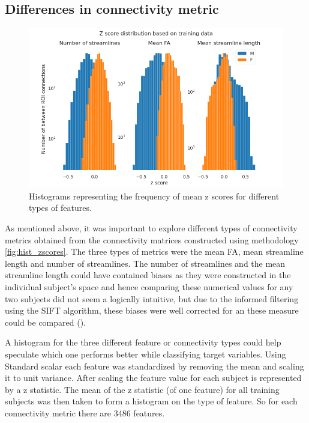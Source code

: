 \documentclass[msthesis.tex]{subfiles}
\begin{document}
\subsection{Differences in connectivity metric}
\begin{figure}
    \centering
    \includegraphics[width=\textwidth]{images/zscoredist.png}
    \caption{Histograms representing the frequency of mean z scores for different types of features.}
    \label{fig:hist_zscores}
\end{figure} 
As mentioned above, it was important to explore different types of connectivity metrics obtained from the connectivity matrices constructed using methodology \autoref{fig:hist_zscores}. The three types of metrics were the mean FA, mean streamline length and number of streamlines. The number of streamlines and the mean streamline length could have contained biases as they were constructed in the individual subject's space and hence comparing these numerical values for any two subjects did not seem a logically intuitive, but due to the informed filtering using the SIFT algorithm, these biases were well corrected for an these measure could be compared (\cite{yeh2020mapping}). 

A histogram for the three different feature or connectivity types could help speculate which one performs better while classifying target variables.  Using Standard scalar each feature was standardized by removing the mean and scaling it to unit variance. After scaling the feature value for each subject is represented by a z statistic. The mean of the z statistic (of one feature) for all training subjects was then taken to form a histogram on the type of feature. So for each connectivity metric there are 3486 features.
\end{document}
